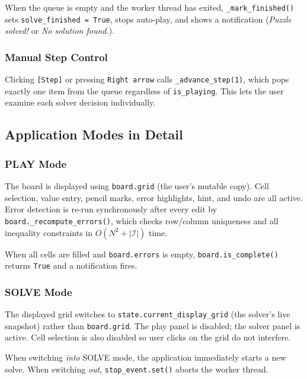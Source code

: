When the queue is empty and the worker thread has exited,
\texttt{\_mark\_finished()} sets \texttt{solve\_finished = True},
stops auto-play, and shows a notification
(\emph{Puzzle solved!} or \emph{No solution found.}).

\subsubsection{Manual Step Control}

Clicking \texttt{[Step]} or pressing \texttt{Right arrow} calls
\texttt{\_advance\_step(1)}, which pops exactly one item from the queue
regardless of \texttt{is\_playing}.
This lets the user examine each solver decision individually.

\subsection{Application Modes in Detail}
\label{sec:ui_modes}

\subsubsection{PLAY Mode}

The board is displayed using \texttt{board.grid} (the user's mutable copy).
Cell selection, value entry, pencil marks, error highlights, hint, and undo
are all active.
Error detection is re-run synchronously after every edit by
\texttt{board.\_recompute\_errors()}, which checks row/column uniqueness and
all inequality constraints in $O(N^2 + |\mathcal{I}|)$ time.

When all cells are filled and \texttt{board.errors} is empty,
\texttt{board.is\_complete()} returns \texttt{True} and a notification fires.

\subsubsection{SOLVE Mode}

The displayed grid switches to \texttt{state.current\_display\_grid}
(the solver's live snapshot) rather than \texttt{board.grid}.
The play panel is disabled; the solver panel is active.
Cell selection is also disabled so user clicks on the grid do not interfere.

When switching \emph{into} SOLVE mode, the application immediately starts a
new solve.
When switching \emph{out}, \texttt{stop\_event.set()} aborts the worker thread.

